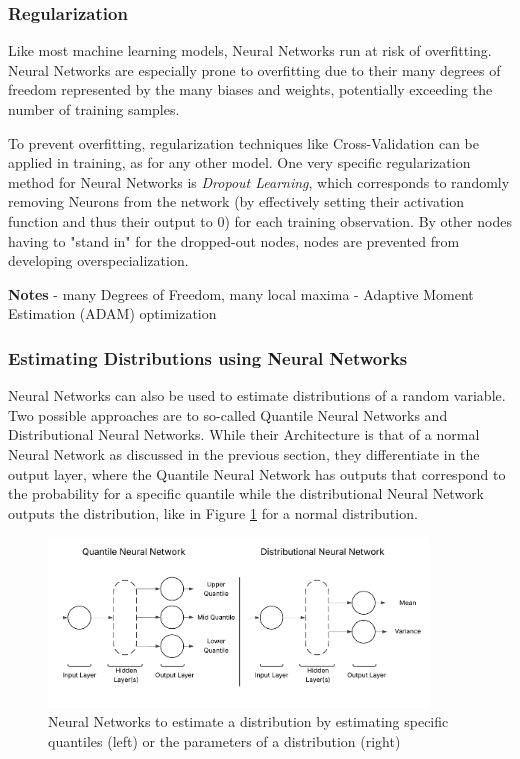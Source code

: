  \subsubsection{Regularization}
 
 Like most machine learning models, Neural Networks run at risk of overfitting. Neural Networks are especially prone to overfitting due to their many degrees of freedom represented by the many biases and weights, potentially exceeding the number of training samples.

 To prevent overfitting, regularization techniques like Cross-Validation can be applied in training, as for any other model. One very specific regularization method for Neural Networks is \textit{Dropout Learning}, which corresponds to randomly removing Neurons from the network (by effectively setting their activation function and thus their output to 0) for each training observation. By other nodes having to "stand in" for the dropped-out nodes, nodes are prevented from developing overspecialization. \cite{James2023}



\textbf{Notes}
- many Degrees of Freedom, many local maxima
- Adaptive Moment Estimation (ADAM) optimization

\subsubsection{Estimating Distributions using Neural Networks }

Neural Networks can also be used to estimate distributions of a random variable. Two possible approaches are to so-called Quantile Neural Networks and Distributional Neural Networks. While their Architecture is that of a normal Neural Network as discussed in the previous section, they differentiate in the output layer, where the Quantile Neural Network has outputs that correspond to the probability for a specific quantile while the distributional Neural Network outputs the distribution, like in Figure  \ref{fig:quantile_dist_nn} for a normal distribution.


\begin{figure}[h] 
	\centering
	\includegraphics[width=0.9\textwidth]{figures/modelling/quantile_dist_nn.png} 
	\caption{Neural Networks to estimate a distribution by estimating specific quantiles (left) or the parameters of a distribution (right)}
	\label{fig:quantile_dist_nn}
\end{figure}

